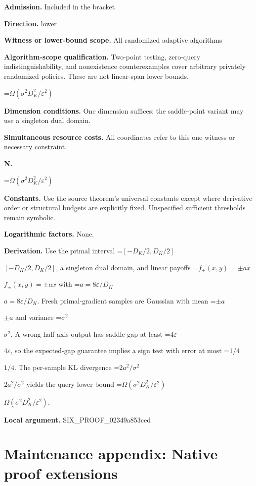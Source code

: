 \documentclass[10pt,a4paper]{article}
\newcommand{\AtlasMath}[1]{\par\begingroup\centering\setbox0=\hbox{$\displaystyle #1$}\ifdim\wd0>1.4\linewidth\typeout{ATLAS WIDE FORMULA: \the\wd0}\fi\ifdim\wd0>\linewidth\resizebox{\linewidth}{!}{\box0}\else\box0\fi\par\endgroup}
\newcommand{\AtlasInlineMath}[1]{\begingroup\setbox0=\hbox{$#1$}\ifdim\wd0>.4\linewidth\endgroup\AtlasMath{#1}\else\endgroup$#1$\fi}
\begin{document}
\textbf{Admission.} Included in the bracket



\textbf{Direction.} lower



\textbf{Witness or lower-bound scope.} All randomized adaptive algorithms



\textbf{Algorithm-scope qualification.} Two-point testing, zero-query indistinguishability, and nonexistence counterexamples cover arbitrary privately randomized policies. These are not linear-span lower bounds.



\AtlasMath{\Omega(\sigma^2D_K^2/\varepsilon^2)}


\textbf{Dimension conditions.} One dimension suffices; the saddle-point variant may use a singleton dual domain.



\textbf{Simultaneous resource costs.} All coordinates refer to this one witness or necessary constraint.



\textbf{N.}



\AtlasMath{\Omega(\sigma^2D_K^2/\varepsilon^2)}


\textbf{Constants.} Use the source theorem’s universal constants except where derivative order or structural budgets are explicitly fixed. Unspecified sufficient thresholds remain symbolic.



\textbf{Logarithmic factors.} None.



\textbf{Derivation.} Use the primal interval \AtlasInlineMath{[-D_K/2,D_K/2]}, a singleton dual domain, and linear payoffs \AtlasInlineMath{f_\pm(x,y)=\pm ax} with \AtlasInlineMath{a=8\varepsilon/D_K}. Fresh primal-gradient samples are Gaussian with mean \AtlasInlineMath{\pm a} and variance \AtlasInlineMath{\sigma^2}. A wrong-half-axis output has saddle gap at least \AtlasInlineMath{4\varepsilon}, so the expected-gap guarantee implies a sign test with error at most \AtlasInlineMath{1/4}. The per-sample KL divergence \AtlasInlineMath{2a^2/\sigma^2} yields the query lower bound \AtlasInlineMath{\Omega(\sigma^2D_K^2/\varepsilon^2)}.



\textbf{Local argument.} SIX\_PROOF\_02349a853ced



\section{Maintenance appendix: Native proof extensions}
\end{document}
